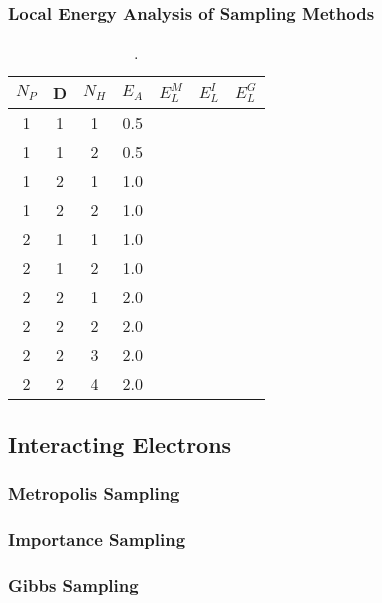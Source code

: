 \documentclass[12pt,a4paper,english]{article}
\begin{document}
\subsubsection{Local Energy Analysis of Sampling Methods}
\label{subsubsect:Results_nonint_Analysis}
\begin{table}[htbp!]
	\centering
	\begin{tabular}{ |c|c|c|c|c|c|c| }
		\hline \rule{0pt}{13pt}
		$N_P$ & D & $N_H$ & $E_A$ & $E_L^M$ & $E_L^I$ & $E_L^G$ \\
		\hline \rule{0pt}{13pt}%
		1 & 1 & 1 & 0.5 &  &  &  \\
		1 & 1 & 2 & 0.5 &  &  &  \\
		\hline \rule{0pt}{13pt}%
		1 & 2 & 1 & 1.0 &  &  &  \\
		1 & 2 & 2 & 1.0 &  &  &  \\
		\hline \rule{0pt}{13pt}%
		2 & 1 & 1 & 1.0 &  &  &  \\
		2 & 1 & 2 & 1.0 &  &  &  \\
		\hline \rule{0pt}{13pt}%
		2 & 2 & 1 & 2.0 &  &  &  \\
		2 & 2 & 2 & 2.0 &  &  &  \\
		2 & 2 & 3 & 2.0 &  &  &  \\
		2 & 2 & 4 & 2.0 &  &  &  \\
		\hline
	\end{tabular}	
	\caption{. \label{tab:Nonint_energies}}
\end{table}
\subsection{Interacting Electrons}
\label{subsect:Results_int}
\subsubsection{Metropolis Sampling}
\label{subsubsect:Results_int_Metropolis}
\subsubsection{Importance Sampling}
\label{subsubsect:Results_int_Importance}
\subsubsection{Gibbs Sampling}
\label{subsubsect:Results_int_Gibbs}
\end{document}
